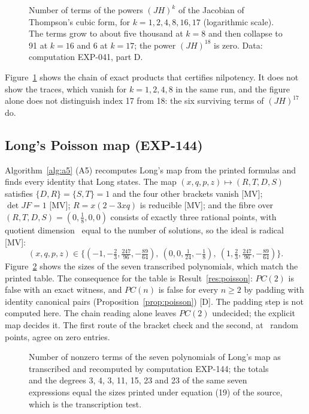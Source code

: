 \documentclass[11pt]{article}
\theoremstyle{remark}
\newcommand{\EXP}[1]{\mbox{EXP-#1}}
\begin{document}
\begin{figure}[t]
\centering

\caption{Number of terms of the powers $(JH)^k$ of the Jacobian of Thompson's cubic form, for $k=1,2,4,8,16,17$ (logarithmic scale). The terms grow to about five thousand at $k=8$ and then collapse to 91 at $k=16$ and 6 at $k=17$; the power $(JH)^{18}$ is zero. Data: computation \EXP{041}, part D.}
\label{fig:chain}
\end{figure}

Figure~\ref{fig:chain} shows the chain of exact products that certifies nilpotency. It does not show the traces, which vanish for $k=1,2,4,8$ in the same run, and the figure alone does not distinguish index 17 from 18: the six surviving terms of $(JH)^{17}$ do.

\subsection{Long's Poisson map (EXP-144)}\label{sec:poissonresult}

Algorithm~\ref{alg:a5} (A5) recomputes Long's map from the printed formulas and finds every identity that Long states. The map $(x,q,p,z)\mapsto(R,T,D,S)$ satisfies $\{D,R\}=\{S,T\}=1$ and the four other brackets vanish [MV]; $\det JF=1$ [MV]; $R=x(2-3xq)$ is reducible [MV]; and the fibre over $(R,T,D,S)=(0,\tfrac18,0,0)$ consists of exactly three rational points, with quotient dimension \npoissonquot\ equal to the number of solutions, so the ideal is radical [MV]:
\begin{equation}\label{eq:longfibre}
(x,q,p,z)\in\Big\{(-1,-\tfrac23,\tfrac{247}{96},-\tfrac{89}{64}),\ (0,0,\tfrac1{24},-\tfrac18),\ (1,\tfrac23,\tfrac{247}{96},-\tfrac{89}{64})\Big\}.
\end{equation}
Figure~\ref{fig:poisson} shows the sizes of the seven transcribed polynomials, which match the printed table. The consequence for the table is Result~\ref{res:poisson}: $PC(2)$ is false with an exact witness, and $PC(n)$ is false for every $n\ge2$ by padding with identity canonical pairs (Proposition~\ref{prop:poisson}) [D]. The padding step is not computed here. The chain reading alone leaves $PC(2)$ undecided; the explicit map decides it. The first route of the bracket check and the second, at \npoissonpts\ random points, agree on zero entries.

\begin{figure}[t]
\centering

\caption{Number of nonzero terms of the seven polynomials of Long's map as transcribed and recomputed by computation \EXP{144}; the totals and the degrees 3, 4, 3, 11, 15, 23 and 23 of the same seven expressions equal the sizes printed under equation (19) of the source, which is the transcription test.}
\label{fig:poisson}
\end{figure}
\end{document}

